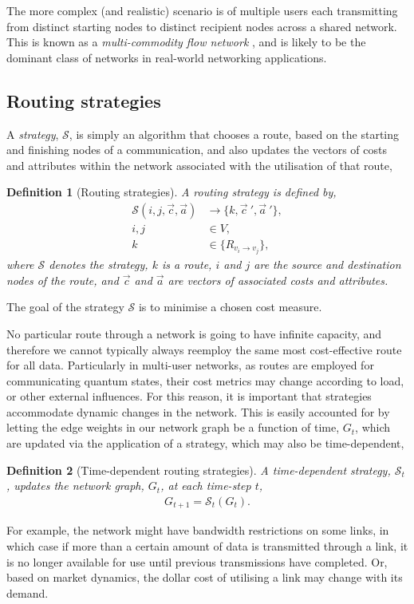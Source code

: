 \documentclass[aps, rmp, twocolumn, amsmath, amssymb, nofootinbib, superscriptaddress, longbibliography, floatfix, table-of-contents, eqsecnum]{revtex4-1}
\newtheorem{definition}{Definition}
\begin{document}
The more complex (and realistic) scenario is of multiple users each transmitting from distinct starting nodes to distinct recipient nodes across a shared network. This is known as a \textit{multi-commodity flow network} \cite{???}, and is likely to be the dominant class of networks in real-world networking applications.

%
%

\subsection{Routing strategies} \label{sec:route_strats} 

A \textit{strategy}, $\mathcal{S}$, is simply an algorithm that chooses a route, based on the starting and finishing nodes of a communication, and also updates the vectors of costs and attributes within the network associated with the utilisation of that route,
\begin{definition}[Routing strategies]
A routing strategy is defined by,
	\begin{align}
\mathcal{S}(i,j,\vec{c},\vec{a}) &\to \{k,{\vec{c}}~',{\vec{a}}~'\}, \nonumber \\
i,j &\in V, \nonumber\\
k &\in \{R_{v_i\to v_j}\},
\end{align}
where $\mathcal{S}$ denotes the strategy, $k$ is a route, $i$ and $j$ are the source and destination nodes of the route, and $\vec{c}$ and $\vec{a}$ are vectors of associated costs and attributes.
\end{definition}
The goal of the strategy $\mathcal{S}$ is to minimise a chosen cost measure.

No particular route through a network is going to have infinite capacity, and therefore we cannot typically always reemploy the same most cost-effective route for all data. Particularly in multi-user networks, as routes are employed for communicating quantum states, their cost metrics may change according to load, or other external influences. For this reason, it is important that strategies accommodate dynamic changes in the network. This is easily accounted for by letting the edge weights in our network graph be a function of time, $G_t$, which are updated via the application of a strategy, which may also be time-dependent,
\begin{definition}[Time-dependent routing strategies]
A time-dependent strategy, $\mathcal{S}_t$, updates the network graph, $G_t$, at each time-step $t$,
\begin{align} \label{eq:S_G}
G_{t+1} = \mathcal{S}_t(G_t).
\end{align}
\end{definition}
For example, the network might have bandwidth restrictions on some links, in which case if more than a certain amount of data is transmitted through a link, it is no longer available for use until previous transmissions have completed. Or, based on market dynamics, the dollar cost of utilising a link may change with its demand.
\end{document}
